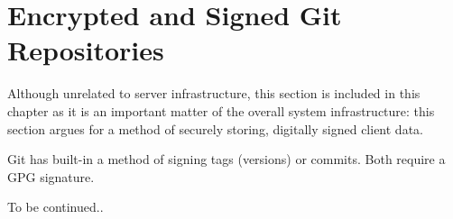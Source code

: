 
\section{Encrypted and Signed Git Repositories}

Although unrelated to server infrastructure, this section is included in this
chapter as it is an important matter of the overall system infrastructure: this
section argues for a method of securely storing, digitally signed client data.

Git has built-in a method of signing tags (versions) or commits. Both require a
GPG signature.

To be continued..
